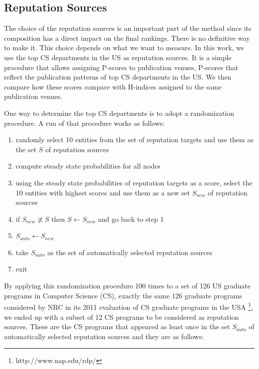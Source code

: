 \documentclass[man]{apa6}
\begin{document}
\subsection{Reputation Sources}
\label{sec:rep-sources}

The choice of the reputation sources is an important part of the method since its composition has a direct impact on the final rankings. There is no definitive way to make it. This choice depends on what we want to measure. In this work, we 
use the top CS departments in the US as reputation sources. It is a simple procedure that allows assigning P-scores 
to publication venues, P-scores that 
reflect the publication patterns of top CS departments in the US. 
We then compare how these scores compare with H-indices assigned to the same publication venues. 

One way to determine the top CS departments is to 
adopt a randomization procedure. A run of that 
procedure works as follows: 
\begin{enumerate}
\item randomly select 10 entities from the set of reputation targets and use them as the set $S$ of reputation sources
\item compute steady state probabilities for all nodes
\item using the steady state probabilities of reputation targets as a score, select the 10 entities with highest scores and use them as a new set $S_{new}$ of reputation sources
\item if $S_{new} \not \equiv S$ then $S \leftarrow S_{new}$ and go back to step 1
\item $S_{auto} \leftarrow S_{new}$ 
\item take $S_{auto}$ as the set of automatically selected reputation sources
\item exit
\end{enumerate}
By applying this randomization procedure 100 times to a set of 126 US graduate programs in Computer Science (CS), 
exactly the same 126 graduate programs considered by NRC in its 2011 evaluation of CS graduate programs 
in the USA \footnote{http://www.nap.edu/rdp/}, we ended up with a subset of 12 CS programs to be considered as reputation sources. 
These are the CS programs that appeared as least once in the set $S_{auto}$ of automatically selected reputation 
sources and they are as follows: 
\end{document}
